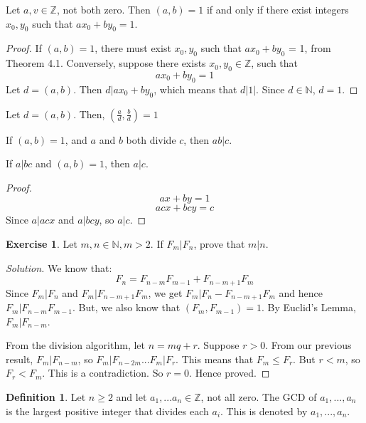 \documentclass[12pt,letterpaper]{book}
\theoremstyle{definition}
\newtheorem{definition}{Definition} %
\newtheorem*{exercise}{Exercise}
\newenvironment{solution}
  {\renewcommand\qedsymbol{$\blacksquare$}\begin{proof}[Solution]}
  {\end{proof}}
\newcommand{\N}{\mathbb{N}}
\newcommand{\Z}{\mathbb{Z}}
\begin{document}
\begin{theorem}
  Let $a,v \in \Z$, not both zero. Then $(a,b) = 1$ if and only if there exist integers $x_0,y_0$ such that $ax_0 + by_0 = 1$.
\end{theorem}
\begin{proof}
  If $(a,b) = 1$, there must exist $x_0,y_0$ such that $ax_0+by_0$ = 1, from Theorem 4.1.
  Conversely, suppose there exists $x_0,y_0 \in \Z$, such that
  \[ax_0 + by_0 = 1\]
  Let $d = (a,b)$. Then $d|ax_0+by_0$, which means that $d|1|$. Since $d \in \N$, $d=1$.
\end{proof}

\begin{corollary}
  Let $d = (a,b)$. Then, $(\frac{a}{d}, \frac{b}{d}) = 1$
\end{corollary}

\begin{corollary}
  If $(a,b) = 1$, and $a$ and $b$ both divide $c$, then $ab|c$.
\end{corollary}

\begin{theorem}
  If $a|bc$ and $(a,b) = 1$, then $a|c$.
\end{theorem}
\begin{proof}
  \[ax+by = 1\]
  \[acx+bcy=c\]
  Since $a|acx$ and $a|bcy$, so $a|c$.
\end{proof}

\begin{exercise}
  Let $m, n \in \N, m > 2$. If $F_m|F_n$, prove that $m|n$.
\end{exercise}
\begin{solution}
  We know that:
  \[F_n = F_{n-m}F_{m-1} + F_{n-m+1}F_m\]
  Since $F_m|F_n$ and $F_m|F_{n-m+1}F_m$, we get $F_m|F_n-F_{n-m+1}F_m$ and hence $F_m|F_{n-m}F_{m-1}$. But, we also know that $(F_m,F_{m-1}) = 1$. By Euclid's Lemma, $F_m|F_{n-m}$.

  From the division algorithm, let $n = mq+r$. Suppose $r > 0$. From our previous result, $F_m|F_{n-m}$, so $F_m|F_{n-2m}...F_m|F_r$. This means that $F_m \leq F_r$. But $r < m$, so $F_r < F_m$. This is a contradiction. So $r = 0$. Hence proved.
\end{solution}

\begin{definition}
  Let $n \geq 2$ and let $a_1,...a_n \in \Z$, not all zero. The GCD of $a_1,...,a_n$ is the largest positive integer that divides each $a_i$. This is denoted by $a_1,...,a_n$.
\end{definition}
\end{document}
